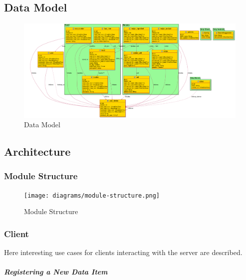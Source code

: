 \documentclass[a4paper]{memoir}
\begin{document}
\chapter{}
\section{Data Model}

\begin{figure}[!ht]
\includegraphics[width=\linewidth]{diagrams/data-model.png}
\caption{Data Model}
\end{figure}

\section{Architecture}

\subsection{Module Structure}

\begin{figure}[!ht]
\texttt{[image: diagrams/module-structure.png]}
\caption{Module Structure}
\end{figure}

\subsection{Client}

Here interesting use cases for clients interacting with the server are
described.

\paragraph{Registering a New Data Item\\}
\end{document}
